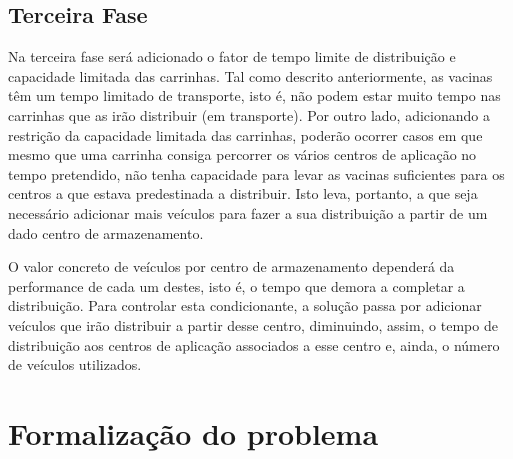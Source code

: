 \documentclass[12pt,a4paper]{report}
\begin{document}
	\section{Terceira Fase}
	Na terceira fase será adicionado o fator de tempo limite de distribuição e capacidade limitada das carrinhas. Tal como descrito anteriormente, as vacinas têm um tempo limitado de transporte, isto é, não podem estar muito tempo nas carrinhas que as irão distribuir (em transporte). Por outro lado, adicionando a restrição da capacidade limitada das carrinhas, poderão ocorrer casos em que mesmo que uma carrinha consiga percorrer os vários centros de aplicação no tempo pretendido, não tenha capacidade para levar as vacinas suficientes para os centros a que estava predestinada a distribuir. Isto leva, portanto, a que seja necessário adicionar mais veículos para fazer a sua distribuição a partir de um dado centro de armazenamento. \par
	O valor concreto de veículos por centro de armazenamento dependerá da performance de cada um destes, isto é, o tempo que demora a completar a distribuição. Para controlar esta condicionante, a solução passa por adicionar veículos que irão distribuir a partir desse centro, diminuindo, assim, o tempo de distribuição aos centros de aplicação associados a esse centro e, ainda, o número de veículos utilizados.


\chapter{Formalização do problema}
\end{document}
